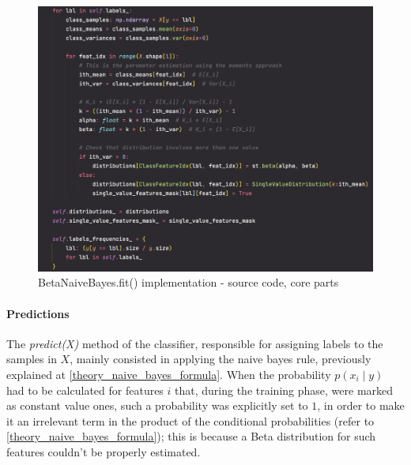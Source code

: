 \begin{figure}[h]
    \centering
    \includegraphics[scale=0.6]{images/exp-results/bayes/bayes-fit.png}
    \caption{BetaNaiveBayes.fit() implementation - source code, core parts}
    \label{fig:exp_res_bayes_fit}
\end{figure}

\paragraph{Predictions} The \textit{predict(X)} method of the classifier, responsible for assigning labels to the samples in $X$, mainly consisted in applying the naive bayes rule, previously explained at \ref{theory_naive_bayes_formula}. When the probability $p(x_i \mid y)$ had to be calculated for features $i$ that, during the training phase, were marked as constant value ones, such a probability was explicitly set to $1$, in order to make it an irrelevant term in the product of the conditional probabilities (refer to \ref{theory_naive_bayes_formula}); this is because a Beta distribution for such features couldn't be properly estimated.

